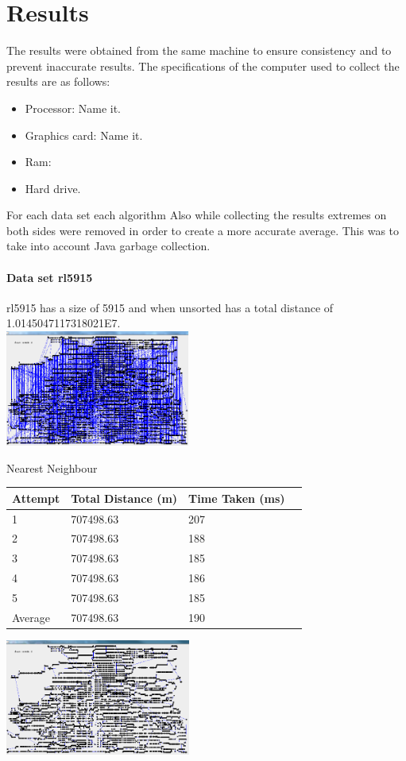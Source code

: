\documentclass[conference,backref=page]{acmsiggraph}
\begin{document}
\section{Results}

The results were obtained from the same machine to ensure consistency and to prevent inaccurate results. The specifications of the computer used to collect the results are as follows:
\begin{itemize}
\item Processor: 	Name it.
\item Graphics card:	Name it.
\item Ram:	
\item Hard drive.
\end{itemize}

For each data set each algorithm
Also while collecting the results extremes on both sides were removed in order to create a more accurate average. This was to take into account Java garbage collection.
\paragraph{Data set rl5915}

rl5915 has a size of 5915 and when unsorted has a total distance of 1.0145047117318021E7.
 \\  \includegraphics[height=1.5in]{images/rl5915unsorted}


\begin{center}	
	
		Nearest Neighbour

	\begin{tabular}{| l | l | l | l |}
		\hline
		Attempt & Total Distance (m) & Time Taken (ms)\\ \hline
		1 & 707498.63 & 207 \\ \hline
		2 & 707498.63 & 188  \\ \hline
		3 & 707498.63 & 185 \\ \hline
		4 & 707498.63 & 186 \\ \hline
		5 & 707498.63 & 185 \\ \hline
		Average & 707498.63 & 190 \\ \hline
	\end{tabular}
	
   \includegraphics[height=1.5in]{images/rl5915nn}
\end{center}
\end{document}
